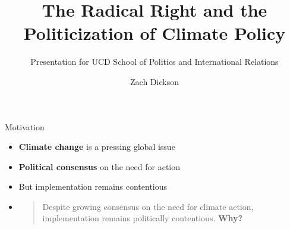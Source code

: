 \documentclass[
  ignorenonframetext,
]{beamer}
\title{The Radical Right and the Politicization of Climate Policy}
\subtitle{Presentation for UCD School of Politics and International
Relations}
\author{Zach Dickson}
\date{}
\institute{(co-authored with Sara Hobolt)London School of Economics}
\begin{document}
\frame{\titlepage}


\begin{frame}{Motivation}
\label{motivation}
\begin{itemize}[<+->]
\item
  \textbf{Climate change} is a pressing global issue
\item
  \textbf{Political consensus} on the need for action
\item
  But implementation remains contentious
\item
  \begin{quote}
  Despite growing consensus on the need for climate action,
  implementation remains politically contentious. \textbf{Why?}
  \end{quote}
\end{itemize}
\end{frame}
\end{document}
